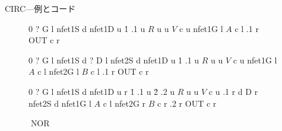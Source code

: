 \documentclass[a4paper,11pt]{amsart}
\theoremstyle{remark}
\DeclareMathOperator{\noT}{NOT}
\DeclareMathOperator{\nand}{NAND}
\DeclareMathOperator{\nor}{NOR}
\begin{document}
\begin{center}
   {\Large CIRC---例とコード}
\end{center}

\begin{figure}[htb]
   \centering
   \begin{minipage}{0.2\columnwidth}
      \centering
      \begin{circuit}0
          {?} G l %
         \frompin nfet1S
          d
         \frompin nfet1D
          u
         \.1
         \frompin .1
          u
         \nl{} {$R$} u
          u
         \cc{}  {$V$} c u
         \frompin nfet1G
          l
         \cc{}  {$A$} c l
         \frompin .1 
          r
         \cc{}  {OUT} c r
      \end{circuit}
      \caption{$\noT$}\label{NOT}
   \end{minipage} 
   \begin{minipage}{0.3\columnwidth}
         \centering
         \begin{circuit}0 
             {?} G l
            \frompin nfet1S
             d
             {?} D l
            \frompin nfet2S
             d
            \frompin nfet1D
             u
            \.1
            \frompin .1
             u
            \nl{} {$R$} u
             u
            \cc{}  {$V$} c u
            \frompin nfet1G
             l
            \cc{}  {$A$} c l
            \frompin nfet2G
             l
            \cc{}  {$B$} c l
            \frompin .1
             r
            \cc{}  {OUT } c r
         \end{circuit}
      \caption{$\nand$}
   \end{minipage} 
   \begin{minipage}{0.3\columnwidth}
      \begin{circuit}0
          {?} G l %
         \frompin nfet1S
          d
         \frompin nfet1D
          u
          r
         \.1
         \frompin .1
          u
         \.2
         \frompin .2
          u
         \nl{} {$R$} u
          u
         \cc{}  {$V$} c u
         \frompin .1
          r
          d
          {} D r
         \frompin nfet2S 
          d
         \frompin nfet1G
          l
         \cc{}  {$A$} c l
         \frompin nfet2G
          r
         \cc{}  {$B$} c r
         \frompin .2 
          r
         \cc{}  {OUT} c r
      \end{circuit}
      \caption{$\nor$}
   \end{minipage} 
\end{figure}
\end{document}
